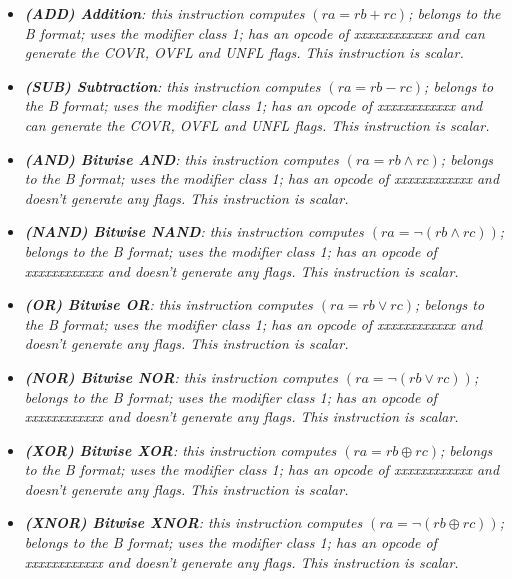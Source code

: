         \begin{multicols}{2}

            \begin{itemize}

                \item \textit{\textbf{(ADD) Addition}: this instruction computes \((ra = rb + rc)\); belongs to the B format; uses the modifier class 1; has an opcode of xxxxxxxxxxxx and can generate the COVR, OVFL and UNFL flags. This instruction is scalar.}

                \item \textit{\textbf{(SUB) Subtraction}: this instruction computes \((ra = rb - rc)\); belongs to the B format; uses the modifier class 1; has an opcode of xxxxxxxxxxxx and can generate the COVR, OVFL and UNFL flags. This instruction is scalar.}

                \item \textit{\textbf{(AND) Bitwise AND}: this instruction computes \((ra = rb \wedge rc)\); belongs to the B format; uses the modifier class 1; has an opcode of xxxxxxxxxxxx and doesn't generate any flags. This instruction is scalar.}

                \item \textit{\textbf{(NAND) Bitwise NAND}: this instruction computes \((ra = \neg(rb \wedge rc))\); belongs to the B format; uses the modifier class 1; has an opcode of xxxxxxxxxxxx and doesn't generate any flags. This instruction is scalar.}

                \item \textit{\textbf{(OR) Bitwise OR}: this instruction computes \((ra = rb \vee rc)\); belongs to the B format; uses the modifier class 1; has an opcode of xxxxxxxxxxxx and doesn't generate any flags. This instruction is scalar.}

                \item \textit{\textbf{(NOR) Bitwise NOR}: this instruction computes \((ra = \neg(rb \vee rc))\); belongs to the B format; uses the modifier class 1; has an opcode of xxxxxxxxxxxx and doesn't generate any flags. This instruction is scalar.}

                \item \textit{\textbf{(XOR) Bitwise XOR}: this instruction computes \((ra = rb \oplus rc)\); belongs to the B format; uses the modifier class 1; has an opcode of xxxxxxxxxxxx and doesn't generate any flags. This instruction is scalar.}

                \item \textit{\textbf{(XNOR) Bitwise XNOR}: this instruction computes \((ra = \neg(rb \oplus rc))\); belongs to the B format; uses the modifier class 1; has an opcode of xxxxxxxxxxxx and doesn't generate any flags. This instruction is scalar.}


\end{itemize}
\end{multicols}
